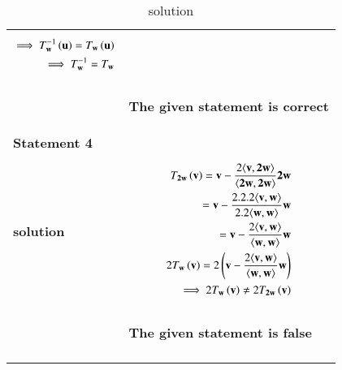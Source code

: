\documentclass[journal,12pt]{IEEEtran}
\begin{document}
\begin{longtable}{|l|l|}
{\begin{align}
\implies T_\mathbf{w}^{-1}\left(\mathbf{u}\right)= T_\mathbf{w}\left(\mathbf{u}\right)\\
\implies T_\mathbf{w}^{-1}= T_\mathbf{w}
\end{align}}\\
& \parbox{10cm}{\begin{center}
\textbf{The given statement is correct}
\end{center}}\\
\hline 
\textbf{Statement 4} & \\ 
\hline
\textbf{solution}  & \parbox{10cm} {\begin{align}
T_\mathbf{2w}\left(\mathbf{v}\right)=\mathbf{v}-\frac{2\langle \mathbf{v},\mathbf{2w} \rangle}{\langle \mathbf{2w},\mathbf{2w} \rangle}\mathbf{2w}\\
=\mathbf{v}-\frac{2.2.2\langle \mathbf{v},\mathbf{w} \rangle}{2.2\langle \mathbf{w},\mathbf{w} \rangle}\mathbf{w}\\
=\mathbf{v}-\frac{2\langle \mathbf{v},\mathbf{w} \rangle}{\langle \mathbf{w},\mathbf{w} \rangle}\mathbf{w}\\
2T_\mathbf{w}\left(\mathbf{v}\right)=2\left(\mathbf{v}-\frac{2\langle \mathbf{v},\mathbf{w} \rangle}{\langle \mathbf{w},\mathbf{w} \rangle}\mathbf{w}\right)\\
\implies2T_\mathbf{w}\left(\mathbf{v}\right)\neq 2T_\mathbf{2w}\left(\mathbf{v}\right)
\end{align}}\\
& \parbox{10cm}{\begin{center}
\textbf{The given statement is false}
\end{center}}\\
\hline
\caption{solution}
\label{deftab}
\end{longtable}
\end{document}

